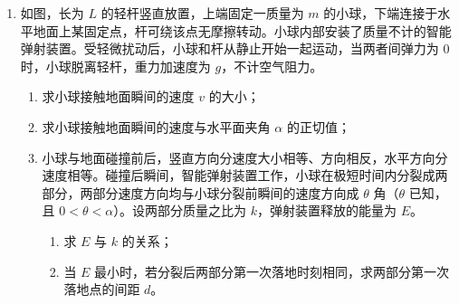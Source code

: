 \documentclass[\gkver]{gaokaozhenti}
\begin{document}
\begin{enumerate}
{联立可得 $v = \frac{E}{BL} - \frac{BLU_{0}}{mk}$

（3）从 $t_{0} \sim t_{1}$ 过程对导体棒，根据动量定理 $BIL \cdot t = mv_{0}$

又 $q' = \bar{I} \cdot t$

可得 $q' = \frac{mE}{B^{2}L^{2}}$

导体棒上产生的焦耳热 $Q_{1} = q_{1}E - \frac{1}{2}mv_{0}^{2}$

可得 $Q_{1} = \frac{mE^{2}}{2B^{2}L^{2}}$

从 $t_{1}$ 时刻到导体棒静止过程中，根据能量守恒定律可知电路中产生的焦耳热为 $Q_{\text{总}} = \frac{1}{2}mv_{0}^{2}$

导体棒产生的焦耳热为 $Q_{2} = \frac{r}{R + r} \cdot Q_{\text{总}}$

可得 $Q_{2}=\frac{mrE^{2}}{2(R+r)B^{2}L^{2}}$

从 $t_{0}$ 时刻起到导体棒静止的过程中，导体棒上产生的焦耳热
$Q=Q_{1}+Q_{2}=\frac{(R+2r)mE^{2}}{2(R+r)B^{2}L^{2}}$
}
\item
如图，长为 $L$ 的轻杆竖直放置，上端固定一质量为 $m$ 的小球，下端连接于水平地面上某固定点，杆可绕该点无摩擦转动。小球内部安装了质量不计的智能弹射装置。受轻微扰动后，小球和杆从静止开始一起运动，当两者间弹力为 0 时，小球脱离轻杆，重力加速度为 $g$，不计空气阻力。
\begin{enumerate}
	\item
	求小球接触地面瞬间的速度 $v$ 的大小；
	\item
	求小球接触地面瞬间的速度与水平面夹角 $\alpha$ 的正切值；
	\item
	小球与地面碰撞前后，竖直方向分速度大小相等、方向相反，水平方向分速度相等。碰撞后瞬间，智能弹射装置工作，小球在极短时间内分裂成两部分，两部分速度方向均与小球分裂前瞬间的速度方向成 $\theta$ 角（$\theta$ 已知，且 $0 < \theta < \alpha$）。设两部分质量之比为 $k$，弹射装置释放的能量为 $E$。
	\begin{enumerate}[label=(\roman*)]
		\item
		求 $E$ 与 $k$ 的关系；
		\item
		当 $E$ 最小时，若分裂后两部分第一次落地时刻相同，求两部分第一次落地点的间距 $d$。
	\end{enumerate}
\end{enumerate}
\onepicture[align=right, w=6.50cm]{}
\end{enumerate}
\end{document}
